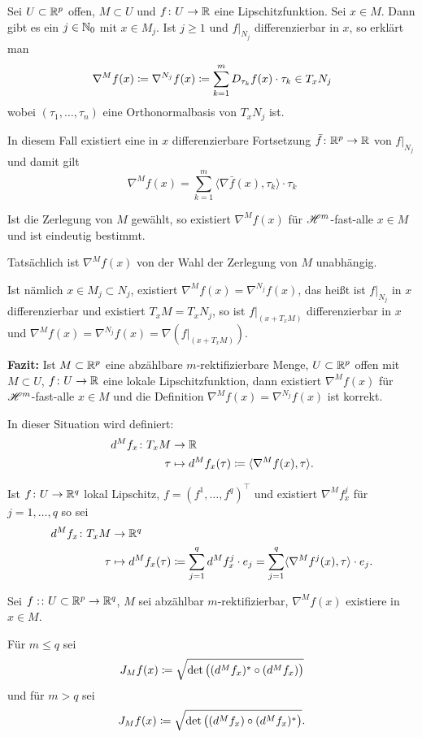\documentclass[a4paper,twoside,DIV15,BCOR12mm]{scrbook}
\newcommand{\HM}{\H}
\begin{document}
Sei $U\subset\mathbb{R}^p$ offen, $M\subset U$ und $f\colon U\to \mathbb{R}$ eine Lipschitzfunktion. Sei $x\in M$. Dann gibt es ein $j\in\mathbb{N}_0$ mit $x\in M_j$. Ist $j\ge 1$ und $f|_{N_j}$ differenzierbar in $x$, so erklärt man
\[
\nabla^M f(x) \da \nabla^{N_j} f(x) \da \sum_{k=1}^m  D_{\tau_k}f(x) \cdot \tau_k  \in T_xN_j
\]
wobei $(\tau_1,\ldots,\tau_n)$ eine Orthonormalbasis von $T_xN_j$ ist.

In diesem Fall existiert eine in $x$ differenzierbare Fortsetzung $\bar f\colon \mathbb{R}^p \to \mathbb{R}$ von $f|_{N_j}$ und damit gilt 
\[
\nabla^M f(x) = \sum_{k=1}^m \langle \nabla\bar f(x), \tau_k\rangle \cdot \tau_k
\]

\begin{bemerkungen}
\item Ist die Zerlegung von $M$ gewählt, so existiert $\nabla^Mf(x)$ für $\HM^m$-fast-alle $x\in M$ und ist eindeutig bestimmt.
\item Tatsächlich ist $\nabla^M f(x)$ von der Wahl der Zerlegung von $M$ unabhängig.

Ist nämlich $x\in M_j\subset N_j$, existiert $\nabla^M f(x) = \nabla^{N_j}f(x)$, das heißt ist $f|_{N_j}$ in $x$ differenzierbar und existiert $T_xM = T_xN_j$, so ist $f|_{(x+T_xM)}$ differenzierbar in $x$ und $\nabla^Mf(x) = \nabla^{N_j} f(x) = \nabla(f|_{(x+T_xM)})$.
\end{bemerkungen}

\textbf{Fazit:} Ist $M\subset \mathbb{R}^p$ eine abzählbare $m$-rektifizierbare Menge, $U\subset\mathbb{R}^p$ offen mit $M\subset U$, $f\colon U\to \mathbb{R}$ eine lokale Lipschitzfunktion, dann existiert $\nabla^Mf(x)$ für $\HM^m$-fast-alle $x\in M$ und die Definition $\nabla^Mf(x) = \nabla^{N_j} f(x)$ ist korrekt.

In dieser Situation wird definiert:
\begin{align*}
d^M f_x \colon T_xM &\to \MdR \\
\tau &\mapsto d^Mf_x(\tau) \da \langle \nabla^Mf(x), \tau\rangle.
\end{align*}

Ist $f\colon U\to\mathbb{R}^q$ lokal Lipschitz, $f=(f^1,\ldots,f^q)^\top$ und existiert $\nabla^Mf^j_x$ für $j=1,\ldots,q$ so sei 
\begin{align*}
d^M f_x \colon T_xM &\to \MdR^q \\
\tau &\mapsto d^Mf_x(\tau) \da \sum_{j=1}^q d^Mf^j_x \cdot e_j = \sum_{j=1}^q \langle \nabla^Mf^j(x), \tau\rangle \cdot e_j.
\end{align*}

\begin{definition}
Sei $f:\colon U\subset\mathbb{R}^p \to \mathbb{R}^q$, $M$ sei abzählbar $m$-rektifizierbar, $\nabla^M f(x)$ existiere in $x\in M$.

Für $m\le q$ sei
\[
J_M f(x) \da \sqrt{\det \big( (d^Mf_x)^*\circ (d^Mf_x)\big)}
\]
und für $m> q$ sei 
\[
J_M f(x) \da \sqrt{\det \big( (d^Mf_x)\circ (d^Mf_x)^*\big)}.
\]
\end{definition}
\end{document}
